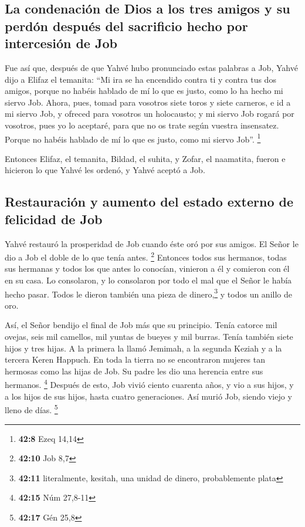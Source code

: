 \begin{paracol}{2}
{\subsection{La condenación de Dios a los tres amigos y su perdón después
del sacrificio hecho por intercesión de
Job}\label{la-condenaciuxf3n-de-dios-a-los-tres-amigos-y-su-perduxf3n-despuuxe9s-del-sacrificio-hecho-por-intercesiuxf3n-de-job}}

 Fue así que, después de que Yahvé hubo pronunciado estas
palabras a Job, Yahvé dijo a Elifaz el temanita: ``Mi ira se ha
encendido contra ti y contra tus dos amigos, porque no habéis hablado de
mí lo que es justo, como lo ha hecho mi siervo Job. 
Ahora, pues, tomad para vosotros siete toros y siete carneros, e id a mi
siervo Job, y ofreced para vosotros un holocausto; y mi siervo Job
rogará por vosotros, pues yo lo aceptaré, para que no os trate según
vuestra insensatez. Porque no habéis hablado de mí lo que es justo, como
mi siervo Job''. \footnote{\textbf{42:8} Ezeq 14,14}

 Entonces Elifaz, el temanita, Bildad, el suhita, y Zofar,
el naamatita, fueron e hicieron lo que Yahvé les ordenó, y Yahvé aceptó
a Job.

\hypertarget{restauraciuxf3n-y-aumento-del-estado-externo-de-felicidad-de-job}{%
\subsection{Restauración y aumento del estado externo de felicidad de
Job}\label{restauraciuxf3n-y-aumento-del-estado-externo-de-felicidad-de-job}}

 Yahvé restauró la prosperidad de Job cuando éste oró por
sus amigos. El Señor le dio a Job el doble de lo que tenía antes.
\footnote{\textbf{42:10} Job 8,7}  Entonces todos sus
hermanos, todas sus hermanas y todos los que antes lo conocían, vinieron
a él y comieron con él en su casa. Lo consolaron, y lo consolaron por
todo el mal que el Señor le había hecho pasar. Todos le dieron también
una pieza de dinero,\footnote{\textbf{42:11} literalmente, kesitah, una
  unidad de dinero, probablemente plata} y todos un anillo de oro.

 Así, el Señor bendijo el final de Job más que su
principio. Tenía catorce mil ovejas, seis mil camellos, mil yuntas de
bueyes y mil burras.  Tenía también siete hijos y tres
hijas.  A la primera la llamó Jemimah, a la segunda
Keziah y a la tercera Keren Happuch.  En toda la tierra
no se encontraron mujeres tan hermosas como las hijas de Job. Su padre
les dio una herencia entre sus hermanos. \footnote{\textbf{42:15} Núm
  27,8-11}  Después de esto, Job vivió ciento cuarenta
años, y vio a sus hijos, y a los hijos de sus hijos, hasta cuatro
generaciones.  Así murió Job, siendo viejo y lleno de
días. \footnote{\textbf{42:17} Gén 25,8} \switchcolumn
\begin{otherlanguage}{english}


\end{otherlanguage}
\end{paracol}
